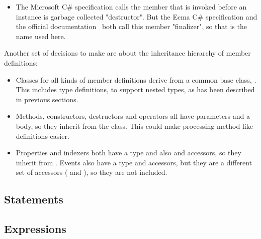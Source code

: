 \begin{itemize}
\item The Microsoft C\# specification calls the member that is invoked before an instance is garbage collected "destructor". But the Ecma C\# specification\footnotemark{} and the official documentation~\cite{finalizer} both call this member "finalizer", so that is the name used here.


\end{itemize}

\medskip

Another set of decisions to make are about the inheritance hierarchy of member definitions:

\begin{itemize}
\item Classes for all kinds of member definitions derive from a common base class, . This includes type definitions, to support nested types, as has been described in previous sections.
\item Methods, constructors, destructors and operators all have parameters and a body, so they inherit from the  class. This could make processing method-like definitions easier.
\item Properties and indexers both have a type and also  and  accessors, so they inherit from . Events also have a type and accessors, but they are a different set of accessors ( and ), so they are not included.
\end{itemize}


\subsection{Statements}

\subsection{Expressions}

